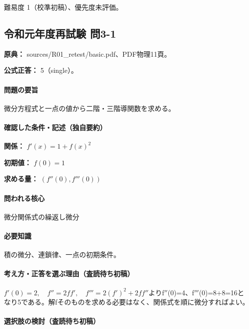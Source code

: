 \par 難易度 1（校準初稿）、優先度未評価。

\subsection{令和元年度再試験 問3-1}
\label{q:r01-ret-basic-3-1}

\noindent\textbf{原典：} sources/R01\_retest/basic.pdf、PDF物理11頁。

\textbf{公式正答：} 5（single）。

\paragraph{問題の要旨} 微分方程式と一点の値から二階・三階導関数を求める。

\paragraph{確認した条件・記述（独自要約）}\mbox{}\par

\noindent\textbf{関係：} \(f'(x)=1+f(x)^2\)\par

\noindent\textbf{初期値：} \(f(0)=1\)\par

\noindent\textbf{求める量：} \((f''(0),f'''(0))\)\par

\paragraph{問われる核心} 微分関係式の繰返し微分

\paragraph{必要知識} 積の微分、連鎖律、一点の初期条件。

\paragraph{考え方・正答を選ぶ理由（査読待ち初稿）} \(f'(0)=2,\quad f''=2ff',\quad f'''=2(f')^2+2ff''\)よりf\ensuremath{''}(0)=\allowbreak{}4、f\ensuremath{'''}(0)=\allowbreak{}8+8=\allowbreak{}16となり5である。解fそのものを求める必要はなく、関係式を順に微分すればよい。

\paragraph{選択肢の検討（査読待ち初稿）}\mbox{}\par

